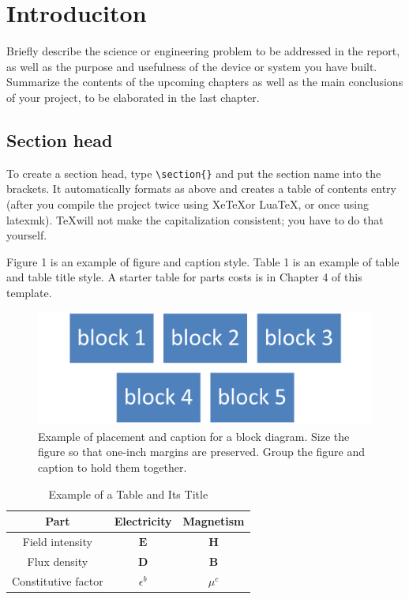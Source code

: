 \chapter{Introduciton}
Briefly describe the science or engineering problem to be addressed in the report, as well as the purpose and usefulness of the device or system you have built. Summarize the contents of the upcoming chapters as well as the main conclusions of your project, to be elaborated in the last chapter.

\section{Section head}
To create a section head, type \verb|\section{}| and put the section name into the brackets. It automatically formats as above and creates a table of contents entry (after you compile the project twice using Xe\TeX or Lua\TeX, or once using latexmk). \TeX will not make the capitalization consistent; you have to do that yourself.

Figure 1 is an example of figure and caption style. Table 1 is an example of table and table title style. A starter table for parts costs is in Chapter 4 of this template.

\begin{figure}[H]
    \centering
    \includegraphics[width=\textwidth]{figs/Picture1.png}
    \caption{Example of placement and caption for a block diagram. Size the figure so that one-inch margins are preserved. Group the figure and caption to hold them together.}
\end{figure}
\begin{table}[H]
    \centering
    \caption{Example of a Table and Its Title}
    \begin{tabular}{@{}ccc@{}}
    \toprule
    \bf Part & \bf Electricity & \bf Magnetism \\ \midrule
    Field intensity & $\mathbf{E}$ & $\mathbf{H}$ \\
    Flux density & $\mathbf{D}$ & $\mathbf{B}$ \\
    Constitutive factor & $\epsilon^b$ & $\mu^c$ \\ \bottomrule
    \end{tabular}
\end{table}